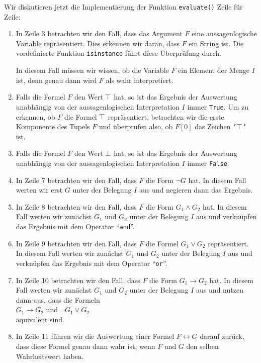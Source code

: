 \noindent
Wir diskutieren jetzt die Implementierung der Funktion \texttt{evaluate()} Zeile für
Zeile:
\begin{enumerate}
\item In Zeile 3 betrachten wir den Fall, dass das Argument $F$ eine aussagenlogische
      Variable repräsentiert.  Dies erkennen wir daran, dass $F$ ein String ist.
      Die vordefinierte Funktion \texttt{isinstance} führt diese Überprüfung durch.

      In diesem Fall müssen wir wissen, ob die Variable $F$ ein Element der Menge $I$ ist, denn genau dann
      wird $F$ als wahr interpretiert.
\item Falls die Formel $F$ den Wert $\top$ hat, so ist das Ergebnis der Auswertung unabhängig von der
      aussagenlogischen Interpretation $I$ immer \texttt{True}. 
      Um zu erkennen, ob $F$ die Formel $\top$ repräsentiert, betrachten wir die erste Komponente
      des Tupels $F$ und überprüfen also, ob $F[0]$ das Zeichen \texttt{'$\top$'} ist.
\item Falls die Formel $F$ den Wert $\bot$ hat, so ist das Ergebnis der
      Auswertung unabhängig von der aussagenlogischen Interpretation $I$ immer \texttt{False}.
\item In Zeile 7 betrachten wir den Fall, dass $F$ die Form $\neg G$  hat.
      In diesem Fall werten wir erst $G$ unter der Belegung $I$ aus und negieren dann das Ergebnis.
\item In Zeile 8 betrachten wir den Fall, dass $F$ die Form 
      $G_1 \wedge G_2$ hat.
      In diesem Fall werten wir zunächst $G_1$ und $G_2$ unter der Belegung $I$ 
      aus und verknüpfen  das Ergebnis mit dem Operator ``\texttt{and}''.
\item In Zeile 9 betrachten wir den Fall, dass $F$ die Formel $G_1 \vee G_2$ repräsentiert.
      In diesem Fall werten wir zunächst $G_1$ und $G_2$ unter der Belegung $I$ 
      aus und verknüpfen  das Ergebnis mit dem Operator ``\texttt{or}''.
\item In Zeile 10 betrachten wir den Fall, dass $F$ die Form $G_1 \rightarrow G_2$ hat.
      In diesem Fall werten wir zunächst $G_1$ und $G_2$ unter der Belegung $I$ 
      aus und nutzen dann aus, dass die Formeln
      \\[0.2cm]
      \hspace*{1.3cm}
      $G_1 \rightarrow G_2$ \quad und \quad $\neg G_1 \vee G_2$
      \\[0.2cm]
      äquivalent sind.
\item In Zeile 11 führen wir die Auswertung einer Formel $F \leftrightarrow G$ darauf zurück, dass diese
      Formel genau dann wahr ist, wenn $F$ und $G$ den selben Wahrheitswert haben.
\end{enumerate}

